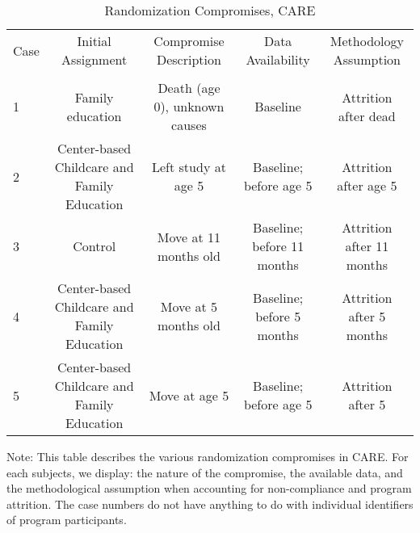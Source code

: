 \begin{sidewaystable}[H] 
\begin{threeparttable}
\caption{Randomization Compromises, CARE}
\label{table:care_compromises}
\centering
\footnotesize
\begin{tabular}{lcccc} \toprule
 Case & Initial Assignment & Compromise Description & Data Availability & Methodology Assumption \\ \\ \midrule
1&Family education & Death (age 0), unknown causes & Baseline & Attrition after dead \\
2&Center-based Childcare and Family Education  & Left study at age 5  & Baseline; before age 5 & Attrition after age 5 \\
3&Control & Move at 11 months old & Baseline; before 11 months & Attrition after 11 months \\
4&Center-based Childcare and Family Education & Move at 5 months old & Baseline; before 5 months & Attrition after 5 months \\
5&Center-based Childcare and Family Education & Move at age 5 & Baseline; before age 5 & Attrition after 5 \\ \bottomrule
\end{tabular}
\begin{tablenotes}
\item Note: This table describes the various randomization compromises in CARE. For each subjects, we display: the nature of the compromise, the available data, and the methodological assumption when accounting for non-compliance and program attrition. The case numbers do not have anything to do with individual identifiers of program participants. 
\end{tablenotes}
\end{threeparttable}
\end{sidewaystable}